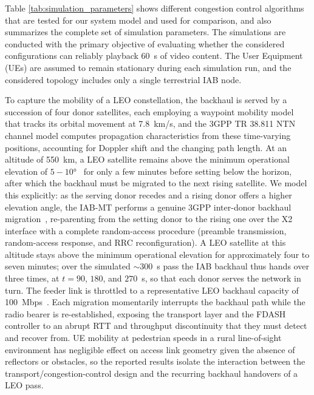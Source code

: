 \documentclass[journal]{IEEEtran}
\begin{document}
 Table \ref{tab:simulation_parameters} shows different congestion control algorithms that are tested for our system model and used for comparison, and also summarizes the complete set of simulation parameters. The simulations are conducted with the primary objective of evaluating whether the considered configurations can reliably playback 60~s of video content. The User Equipment (UEs) are assumed to remain stationary during each simulation run, and the considered topology includes only a single terrestrial IAB node.

To capture the mobility of a LEO constellation, the backhaul is served by a succession of four donor satellites, each employing a waypoint mobility model that tracks its orbital movement at 7.8~km/s, and the 3GPP TR 38.811 NTN channel model computes propagation characteristics from these time-varying positions, accounting for Doppler shift and the changing path length. At an altitude of 550~km, a LEO satellite remains above the minimum operational elevation of $5{-}10°$~\cite{3GPP_TR_38_811} for only a few minutes before setting below the horizon, after which the backhaul must be migrated to the next rising satellite. We model this explicitly: as the serving donor recedes and a rising donor offers a higher elevation angle, the IAB-MT performs a genuine 3GPP inter-donor backhaul migration~\cite{3GPP_TR_38_821}, re-parenting from the setting donor to the rising one over the X2 interface with a complete random-access procedure (preamble transmission, random-access response, and RRC reconfiguration). A LEO satellite at this altitude stays above the minimum operational elevation for approximately four to seven minutes; over the simulated $\sim$300~s pass the IAB backhaul thus hands over three times, at $t = 90$, $180$, and $270$~s, so that each donor serves the network in turn. The feeder link is throttled to a representative LEO backhaul capacity of 100~Mbps~\cite{Kassing2020}. Each migration momentarily interrupts the backhaul path while the radio bearer is re-established, exposing the transport layer and the FDASH controller to an abrupt RTT and throughput discontinuity that they must detect and recover from. UE mobility at pedestrian speeds in a rural line-of-sight environment has negligible effect on access link geometry given the absence of reflectors or obstacles, so the reported results isolate the interaction between the transport/congestion-control design and the recurring backhaul handovers of a LEO pass.
\end{document}
